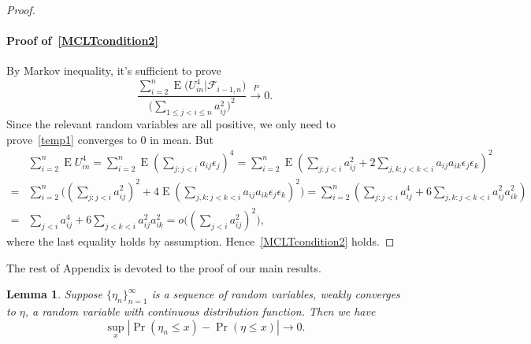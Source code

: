 \documentclass[review]{elsarticle}
\DeclareMathOperator{\myE}{E}
\theoremstyle{plain}
\newtheorem{lemma}{Lemma}
\theoremstyle{definition}
\theoremstyle{remark}
\begin{document}
\begin{proof}
     \paragraph{Proof of~\eqref{MCLTcondition2}}
     By Markov inequality, it's sufficient to prove
     \begin{equation}\label{temp1}
         \frac{\sum_{i=2}^n \myE\big(U_{in}^4\big|\mathcal{F}_{i-1,n}\big)}{{\big(\sum_{1\leq j<i\leq n} a_{ij}^2\big)}^2}\xrightarrow{P} 0.
     \end{equation}
     Since the relevant random variables are all positive, we only need to prove~\eqref{temp1} converges to $0$ in mean. But
     \begin{equation*}
         \begin{aligned}
             &\sum_{i=2}^n \myE U_{in}^4
             =
             \sum_{i=2}^n \myE {(\sum_{j:j<i}a_{ij}\epsilon_j)}^4
             =
             \sum_{i=2}^n \myE {(\sum_{j:j<i}a_{ij}^2+2\sum_{j,k:j<k<i}a_{ij}a_{ik}\epsilon_j \epsilon_k)}^2\\
             =&
             \sum_{i=2}^n  \big({(\sum_{j:j<i}a_{ij}^2)}^2+4\myE{(\sum_{j,k:j<k<i}a_{ij}a_{ik}\epsilon_j \epsilon_k)}^2 \big)
             =
             \sum_{i=2}^n  (\sum_{j:j<i}a_{ij}^4+6\sum_{j,k:j<k<i}a_{ij}^2 a_{ik}^2)\\
             =&
             \sum_{j<i}a_{ij}^4+6\sum_{j<k<i}a_{ij}^2 a_{ik}^2
             =
             o\big({(\sum_{j<i} a_{ij}^2)}^2\big),
         \end{aligned}
     \end{equation*}
     where the last equality holds by assumption. Hence~\eqref{MCLTcondition2} holds.
 \end{proof}

The rest of Appendix is devoted to the proof of our main results.
\begin{lemma}\label{lemmaUniformSimple}
    Suppose $\{\eta_n\}_{n=1}^{\infty}$ is a sequence of random variables, weakly converges to $\eta$, a random variable with continuous distribution function.
    Then we have
    \begin{equation*}
    \sup_{x}|\Pr(\eta_n\leq x)-\Pr(\eta\leq x)|\to 0.
    \end{equation*}
\end{lemma}
\end{document}
